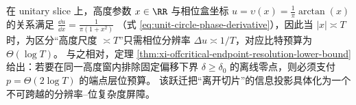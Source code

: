 \label{subsec:xi-certificate-coherence-orthogonal-axis-capacity-part2}

\begin{remark}\label{rem:xi-unitary-vs-offcritical-bit-gap}
在 unitary slice 上，高度参数 \(x\in\RR\) 与相位盒坐标 \(u=\upsilon(x)=\frac{1}{\pi}\arctan(x)\) 的关系满足
\(
\frac{\dd u}{\dd x}=\frac{1}{\pi(1+x^2)}
\)
（式 \eqref{eq:unit-circle-phase-derivative}），因此当 \(|x|\asymp T\) 时，为区分“高度尺度 \(\asymp T\)”只需相位分辨率 \(\Delta u\asymp 1/T\)，对应比特预算为 \(\Theta(\log T)\)。
与之相对，定理 \ref{thm:xi-offcritical-endpoint-resolution-lower-bound} 给出：若要在同一高度窗内排除固定偏移下界 \(\delta\ge\delta_0\) 的离线零点，则必须支付 \(p=\Theta(2\log T)\) 的端点层位预算。
该跃迁把“离开切片”的信息投影具体化为一个不可跨越的分辨率--位复杂度屏障。
\end{remark}


